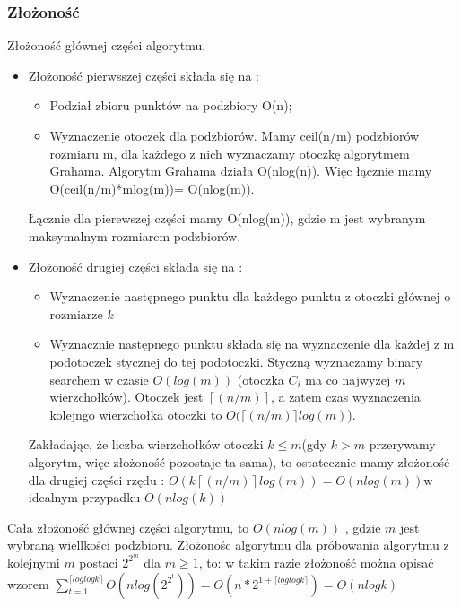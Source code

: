 \documentclass[11pt]{article}
\theoremstyle{remark} \newtheorem{definition}{def.}
\theoremstyle{definition} \newtheorem{twierdzenie}{tw.}
\begin{document}
    \subsubsection{Złożoność}
    Złożoność głównej części algorytmu.
    \begin{itemize}
        \item Złożoność pierwsszej części składa się na :
                \begin{itemize}
                    \item   Podział zbioru punktów na podzbiory O(n);
                    \item   Wyznaczenie otoczek dla podzbiorów. Mamy ceil(n/m) podzbiorów
                            rozmiaru m, dla każdego z nich wyznaczamy otoczkę algorytmem Grahama.
                            Algorytm Grahama działa O(nlog(n)). Więc łącznie mamy O(ceil(n/m)*mlog(m))=
                            O(nlog(m)).
                \end{itemize}
                Łącznie dla pierewszej części mamy O(nlog(m)), gdzie m jest wybranym maksymalnym
                 rozmiarem podzbiorów.

        \item Złożoność drugiej części składa się na :
                 \begin{itemize}
                     \item   Wyznaczenie następnego punktu dla każdego punktu z otoczki głównej o rozmiarze $k$
                     \item   Wyznacznie następnego punktu składa się na wyznaczenie dla każdej z m podotoczek
                            stycznej do tej podotoczki. Styczną wyznaczamy binary searchem w czasie $O(log(m))$
                            (otoczka $C_i$ ma co najwyżej $m$ wierzchołków). Otoczek jest $\left\lceil(n/m) \right\rceil$, a zatem czas
                            wyznaczenia kolejngo wierzchołka otoczki to $O(\lceil(n/m)\rceil log(m)$).    
                 \end{itemize}
                 Zakładając, że liczba wierzchołków otoczki $k \le m$(gdy $k > m$ przerywamy algorytm, więc złożoność pozostaje ta sama),
                  to ostatecznie mamy złożoność dla drugiej części rzędu : $O(k \left\lceil(n/m)\right\rceil log(m)) = O(nlog(m)) $w idealnym przypadku $O(nlog(k))$
    \end{itemize}

    Cała złożoność głównej części algorytmu, to $O(nlog(m))$ , gdzie $m$ jest wybraną wiellkości podzbioru.
    Złożonośc algorytmu dla próbowania algorytmu z kolejnymi $m$ postaci $2^{2^m}$ dla $m \ge 1$, to:
    w takim razie złożoność można opisać wzorem $ \sum_{t=1}^{\lceil log log k \rceil} O(n log (2^{2^t}))=
    O(n*2^{1+{\lceil log log k \rceil}})=O(nlog k) $
\end{document}
